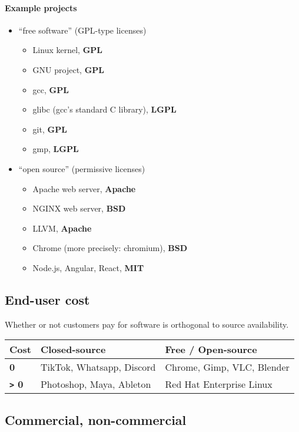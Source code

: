\documentclass[12pt]{article}
\begin{document}
\paragraph{Example projects}

\begin{itemize}
  \item ``free software'' (GPL-type licenses)
  \begin{itemize}
    \item Linux kernel, \textbf{GPL}
    \item GNU project, \textbf{GPL}
    \item gcc, \textbf{GPL}
    \item glibc (gcc’s standard C library), \textbf{LGPL}
    \item git, \textbf{GPL}
    \item gmp, \textbf{LGPL}
  \end{itemize}
  
  \item ``open source'' (permissive licenses)
  \begin{itemize}
    \item Apache web server, \textbf{Apache}
    \item NGINX web server, \textbf{BSD}
    \item LLVM, \textbf{Apache}
    \item Chrome (more precisely: chromium), \textbf{BSD}
    \item Node.js, Angular, React, \textbf{MIT}
  \end{itemize}
\end{itemize}

\subsection{End-user cost}

Whether or not customers pay for software is orthogonal to source availability.

\begin{tabular}{>{\bfseries}l l l}
Cost & Closed-source & Free / Open-source \\
\hline
0 & TikTok, Whatsapp, Discord & Chrome, Gimp, VLC, Blender \\
\texttt{>} 0 & Photoshop, Maya, Ableton & Red Hat Enterprise Linux \\
\end{tabular}
\subsection{Commercial, non-commercial}
\end{document}
